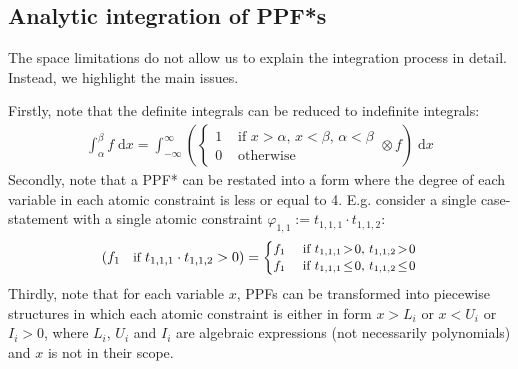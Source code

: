 \documentclass[]{article}
\newcommand{\case}[2]{#2 &\text{ if } #1}%
\newcommand{\otherwise}[1]{#1 &\text{ otherwise}}
\newcommand{\dd}{\;\mathrm{d}} %
\begin{document}
\subsection{Analytic integration of PPF*s}
The space limitations do not allow us to explain the integration process in detail. 
Instead, we highlight the main issues.

Firstly, note that the definite integrals can be reduced to indefinite integrals:
{
\footnotesize\vspace{-0.5mm}
\begin{align*}
\int_{\alpha}^{\beta} f \dd x  = 
\int_{-\infty}^{\infty}
\left (
  \begin{cases}
  \case{x\!>\!\alpha,\, x\!<\!\beta,\, \alpha \!<\! \beta}{1}\\
 \otherwise{0}    
  \end{cases}
\otimes
  f
\right)
\dd x
\end{align*}
}
Secondly, note that a PPF* can be restated into a form where
the degree of each variable in each atomic constraint is less or equal to 4.
E.g. consider a single case-statement with a single atomic constraint 
$\varphi_{1,1} := t_{1,1,1} \cdot t_{1,1,2}$:%
\begin{align*}
{\footnotesize\vspace{-0.5mm}
\left(
f_1 \quad \text{if } t_{1,1,1} \cdot t_{1,1,2} > 0
\right)
 =
\begin{cases}
  \case{t_{1,1,1} \!>\! 0, \, t_{1,1,2} \!>\! 0 }{f_1} \\ 
  \case{t_{1,1,1} \!\leq\! 0, \, t_{1,1,2} \!\leq\! 0 }{f_1} 
 \end{cases} 
}
\end{align*}
Thirdly, note that for each variable $x$, 
PPFs can be transformed into piecewise structures 
in which each atomic constraint is either in form $x>L_i$ or $x<U_i$ or $I_i>0$, 
where $L_i$, $U_i$ and $I_i$ are 
algebraic expressions (not necessarily polynomials) and $x$ is not in their scope. 
\end{document}
